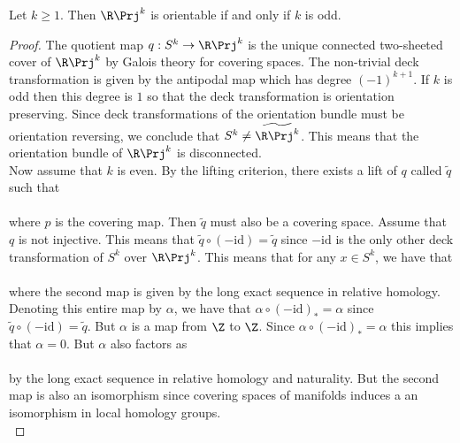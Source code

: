 \documentclass[a4paper]{article}
\begin{document}
\begin{prp}{}{} Let $k\geq 1$. Then $\R\Prj^k$ is orientable if and only if $k$ is odd. 
\begin{proof}
The quotient map $q:S^k\to\R\Prj^k$ is the unique connected two-sheeted cover of $\R\Prj^k$ by Galois theory for covering spaces. The non-trivial deck transformation is given by the antipodal map which has degree $(-1)^{k+1}$. If $k$ is odd then this degree is $1$ so that the deck transformation is orientation preserving. Since deck transformations of the orientation bundle must be orientation reversing, we conclude that $S^k\neq\widetilde{\R\Prj^k}$. This means that the orientation bundle of $\R\Prj^k$ is disconnected. \\

Now assume that $k$ is even. By the lifting criterion, there exists a lift of $q$ called $\widetilde{q}$ such that \\
\\
where $p$ is the covering map. Then $\widetilde{q}$ must also be a covering space. Assume that $q$ is not injective. This means that $\widetilde{q}\circ(-\text{id})=\widetilde{q}$ since $-\text{id}$ is the only other deck transformation of $S^k$ over $\R\Prj^k$. This means that for any $x\in S^k$, we have that \\
\\
where the second map is given by the long exact sequence in relative homology. Denoting this entire map by $\alpha$, we have that $\alpha\circ(-\text{id})_\ast=\alpha$ since $\widetilde{q}\circ(-\text{id})=\widetilde{q}$. But $\alpha$ is a map from $\Z$ to $\Z$. Since $\alpha\circ(-\text{id})_\ast=\alpha$ this implies that $\alpha=0$. But $\alpha$ also factors as \\
\\
by the long exact sequence in relative homology and naturality. But the second map is also an isomorphism since covering spaces of manifolds induces a an isomorphism in local homology groups. \\


\end{proof}
\end{prp}
\end{document}
